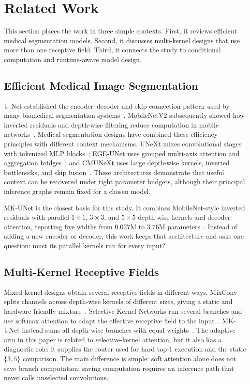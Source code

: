 \documentclass[conference]{IEEEtran}
\begin{document}
\section{Related Work}
This section places the work in three simple contexts. First, it reviews efficient medical segmentation models. Second, it discusses multi-kernel designs that use more than one receptive field. Third, it connects the study to conditional computation and runtime-aware model design.

\subsection{Efficient Medical Image Segmentation}
U-Net established the encoder--decoder and skip-connection pattern used by many biomedical segmentation systems~\cite{ronneberger2015unet}. MobileNetV2 subsequently showed how inverted residuals and depth-wise filtering reduce computation in mobile networks~\cite{sandler2018mobilenetv2}. Medical segmentation designs have combined these efficiency principles with different context mechanisms. UNeXt mixes convolutional stages with tokenized MLP blocks~\cite{valanarasu2022unext}; EGE-UNet uses grouped multi-axis attention and aggregation bridges~\cite{ruan2023egeunet}; and CMUNeXt uses large depth-wise kernels, inverted bottlenecks, and skip fusion~\cite{tang2024cmunext}. These architectures demonstrate that useful context can be recovered under tight parameter budgets, although their principal inference graphs remain fixed for a chosen model.

MK-UNet is the closest basis for this study. It combines MobileNet-style inverted residuals with parallel $1\times1$, $3\times3$, and $5\times5$ depth-wise kernels and decoder attention, reporting five widths from 0.027M to 3.76M parameters~\cite{rahman2025mkunet}. Instead of adding a new encoder or decoder, this work keeps that architecture and asks one question: must its parallel kernels run for every input?

\subsection{Multi-Kernel Receptive Fields}
Mixed-kernel designs obtain several receptive fields in different ways. MixConv splits channels across depth-wise kernels of different sizes, giving a static and hardware-friendly mixture~\cite{tan2019mixconv}. Selective Kernel Networks run several branches and use softmax attention to adapt the effective receptive field to the input~\cite{li2019sknet}. MK-UNet instead sums all depth-wise branches with equal weights~\cite{rahman2025mkunet}. The adaptive arm in this paper is related to selective-kernel attention, but it also has a diagnostic role: it supplies the router used for hard top-1 execution and the static $\{3,5\}$ comparison. The main difference is simple: soft attention alone does not save branch computation; saving computation requires an inference path that never calls unselected convolutions.
\end{document}
